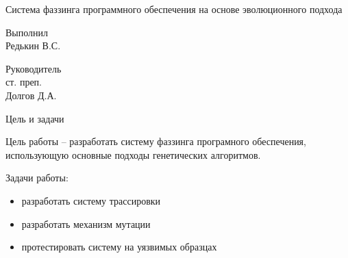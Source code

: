 \documentclass[hyperref={unicode=true}, 12pt]{beamer}
\begin{document}
	
	\begin{frame}[t]
		\vspace{3cm}
		\begin{center}
			\fontsize{14}{16}
			\selectfont
			Система фаззинга программного обеспечения на основе эволюционного подхода
		\end{center}
		\vspace{1cm}
		
		\hfill \begin{minipage}{0.35\textwidth}
			\fontsize{8}{10}
			\selectfont
			
			\raggedleft
			
			
			Выполнил \\
			Редькин В.С.
			
			\vspace{0.1cm}
			
			Руководитель \\
			ст. преп. \\
			Долгов Д.А.
		\end{minipage}
	\end{frame}

	\fontsize{12}{15}
	\selectfont
	
	
	
	
	\begin{frame}[c]{Цель и задачи}
		
		Цель работы -- разработать систему фаззинга програмного обеспечения, использующую основные подходы генетических алгоритмов.
		
		\vspace{0.2cm}
		
		Задачи работы:
		
		\begin{itemize}
				\item разработать систему трассировки
				\item разработать механизм мутации
				\item протестировать систему на уязвимых образцах
		\end{itemize}
		
	\end{frame}
\end{document}
